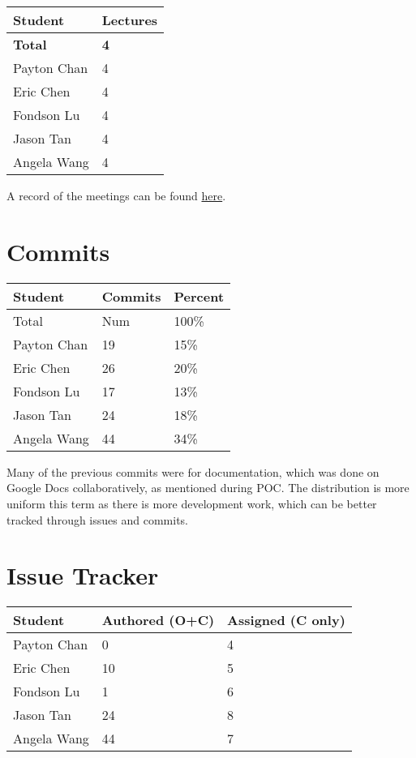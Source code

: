 \documentclass{article}
\begin{document}
\begin{table}[H]
    \centering
    \begin{tabular}{ll}
    \toprule
    \textbf{Student} & \textbf{Lectures}\\
    \midrule
    \textbf{Total} & \textbf{4}\\
    Payton Chan & 4\\
    Eric Chen & 4\\
    Fondson Lu & 4\\
    Jason Tan & 4\\
    Angela Wang & 4\\
    \bottomrule
    \end{tabular}
\end{table}

A record of the meetings can be found
\href{https://github.com/PlutosCapstone/Plutos/issues?q=label%3Ameeting+is%3Aclosed}{here}.
    

\section{Commits}


\begin{table}[H]
\centering
\begin{tabular}{lll}
\toprule
\textbf{Student} & \textbf{Commits} & \textbf{Percent}\\
\midrule
Total & Num & 100\% \\
Payton Chan & 19 & 15\%\\
Eric Chen & 26 & 20\%\\
Fondson Lu & 17 & 13\%\\
Jason Tan & 24 & 18\%\\
Angela Wang & 44 & 34\%\\

\bottomrule
\end{tabular}
\end{table}

Many of the previous commits were for documentation, which was done on Google
Docs collaboratively, as mentioned during POC. The distribution is more uniform
this term as there is more development work, which can be better tracked through
issues and commits.

\section{Issue Tracker}

\begin{table}[H]
\centering
\begin{tabular}{lll}
\toprule
\textbf{Student} & \textbf{Authored (O+C)} & \textbf{Assigned (C only)}\\
\midrule
Payton Chan & 0 & 4\\
Eric Chen & 10 & 5\\
Fondson Lu & 1 & 6\\
Jason Tan & 24 & 8\\
Angela Wang & 44 & 7\\
\bottomrule
\end{tabular}
\end{table}
\end{document}
